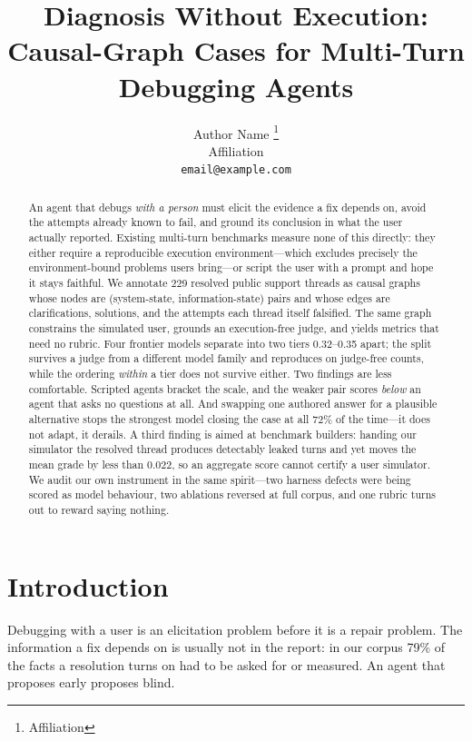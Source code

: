 \documentclass{article} %
\title{Diagnosis Without Execution:\\
Causal-Graph Cases for Multi-Turn Debugging Agents}
\author{Author Name \thanks{Affiliation}\\
Affiliation\\
\texttt{email@example.com}}
\begin{document}
\maketitle

\begin{abstract}
An agent that debugs \emph{with a person} must elicit the evidence a fix
depends on, avoid the attempts already known to fail, and ground its
conclusion in what the user actually reported. Existing multi-turn
benchmarks measure none of this directly: they either require a
reproducible execution environment---which excludes precisely the
environment-bound problems users bring---or script the user with a
prompt and hope it stays faithful. We annotate 229 resolved public
support threads as causal graphs whose nodes are (system-state,
information-state) pairs and whose edges are clarifications, solutions,
and the attempts each thread itself falsified. The same graph constrains
the simulated user, grounds an execution-free judge, and yields metrics
that need no rubric. Four frontier models separate into two tiers
0.32--0.35 apart; the split survives a judge from a different model
family and reproduces on judge-free counts, while the ordering
\emph{within} a tier does not survive either. Two findings are less
comfortable. Scripted agents bracket the scale, and the weaker pair
scores \emph{below} an agent that asks no questions at all. And swapping
one authored answer for a plausible alternative stops the strongest model
closing the case at all 72\% of the time---it does not adapt, it derails. A third finding is aimed at benchmark builders: handing our
simulator the resolved thread produces detectably leaked turns and yet
moves the mean grade by less than 0.022, so an aggregate score cannot
certify a user simulator. We audit our own instrument in the same
spirit---two harness defects were being scored as model behaviour, two
ablations reversed at full corpus, and one rubric turns out to reward
saying nothing.
\end{abstract}

\section{Introduction}

Debugging with a user is an elicitation problem before it is a repair
problem. The information a fix depends on is usually not in the report:
in our corpus 79\% of the facts a resolution turns on had to be asked
for or measured. An agent that proposes early proposes blind.
\end{document}

